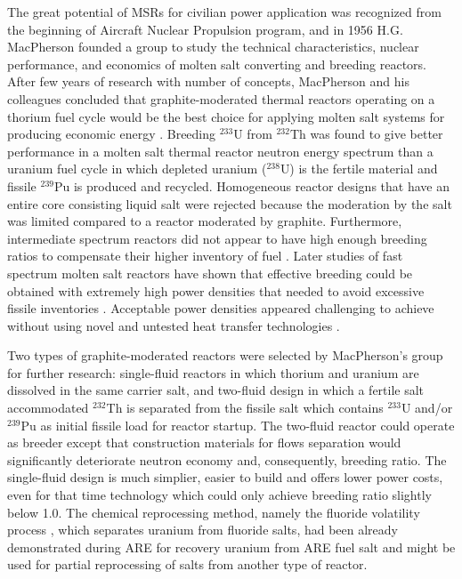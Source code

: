 The great potential of \glspl{MSR} for civilian power application was recognized from the beginning of Aircraft Nuclear Propulsion program, and in 1956 H.G. MacPherson founded a group to study the technical characteristics, nuclear performance, and economics of molten salt converting and breeding reactors. After few years of research with number of concepts, MacPherson and his colleagues concluded that graphite-moderated thermal reactors operating on a thorium fuel cycle would be the best choice for applying molten salt systems for producing economic energy \cite{rosenthal_molten-salt_1970}. Breeding $^{233}$U from $^{232}$Th was found to give better performance in a molten salt thermal reactor neutron energy spectrum than a uranium fuel cycle in which depleted uranium ($^{238}$U) is the fertile material and fissile $^{239}$Pu is produced and recycled. Homogeneous reactor designs that have an entire core consisting liquid salt were rejected because the moderation by the salt was limited compared to a reactor moderated by graphite. Furthermore, intermediate spectrum reactors did not appear to have high enough breeding ratios to compensate their higher inventory of fuel \cite{rosenthal_molten-salt_1970}. Later studies of fast spectrum molten salt reactors have shown that effective breeding could be obtained with extremely high power densities that needed to avoid excessive fissile inventories \cite{kasten_mosel_1964}. Acceptable  power densities appeared challenging to achieve without using novel and untested heat transfer technologies \cite{rosenthal_molten-salt_1970}.

Two types of graphite-moderated reactors were selected by MacPherson's group for further research: single-fluid reactors in which thorium and uranium are dissolved in the same carrier salt, and two-fluid design in which a fertile salt accommodated $^{232}$Th is separated from the fissile salt which contains $^{233}$U and/or $^{239}$Pu as initial fissile load for reactor startup. The two-fluid reactor could operate as breeder except that construction materials for flows separation would significantly deteriorate neutron economy and, consequently, breeding ratio. The single-fluid design is much simplier, easier to build and offers lower power costs, even for that time technology which could only achieve breeding ratio slightly below 1.0. The chemical reprocessing method, namely the fluoride volatility process \cite{cathers_uranium_1957}, which separates uranium from fluoride salts, had been already demonstrated during \gls{ARE} for recovery uranium from \gls{ARE} fuel salt and might be used for partial reprocessing of salts from another type of reactor.

